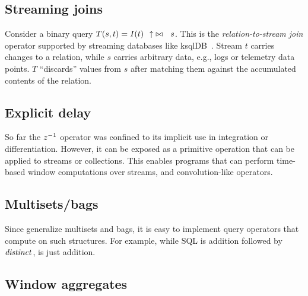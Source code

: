 \subsection{Streaming joins}

Consider a binary query $T(s, t) = \mathit{I}(t)~~{\uparrow}\bowtie~~s$.  This is the
\emph{relation-to-stream join} operator supported by streaming databases like ksqlDB~\cite{jafarpour-edbt19}.
Stream $t$ carries changes to a relation, while $s$ carries arbitrary data, e.g., logs
or telemetry data points. $T$ ``discards'' values from $s$ after matching them against the accumulated contents of the relation.

\begin{center}
\noindent
{}
\end{center}

\subsection{Explicit delay}

So far the $z^{-1}$ operator was confined to its implicit use in integration or
differentiation.  However, it can be exposed as a primitive operation that
can be applied to streams or collections.  This enables programs that can
perform time-based window computations over streams, and convolution-like
operators.  


\subsection{Multisets/bags}

Since \zrs generalize multisets and bags, it is easy to implement query
operators that compute on such structures.  For example, while SQL 
is \zr addition followed by $\mathit{distinct}$,  is just \zr addition.


\subsection{Window aggregates}

